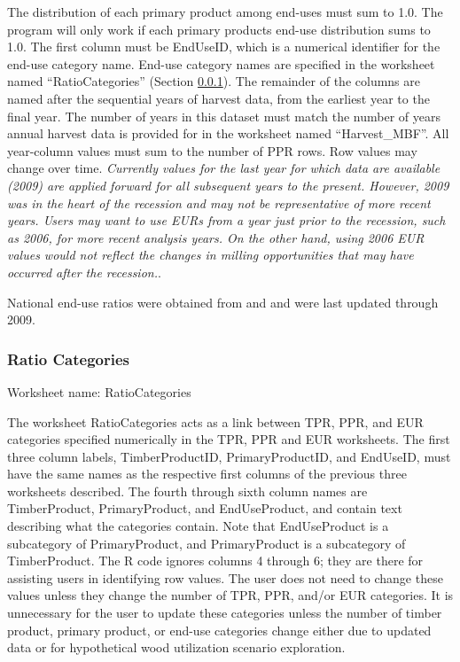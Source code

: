 \documentclass[
  openany]{book}
\begin{document}
The distribution of each primary product among end-uses must sum to 1.0. The program will only work if each primary products end-use distribution sums to 1.0. The first column must be EndUseID, which is a numerical identifier for the end-use category name. End-use category names are specified in the worksheet named ``RatioCategories'' (Section \ref{own-prov-input-rc}). The remainder of the columns are named after the sequential years of harvest data, from the earliest year to the final year. The number of years in this dataset must match the number of years annual harvest data is provided for in the worksheet named ``Harvest\_MBF''. All year-column values must sum to the number of PPR rows. Row values may change over time. \emph{Currently values for the last year for which data are available (2009) are applied forward for all subsequent years to the present. However, 2009 was in the heart of the recession and may not be representative of more recent years. Users may want to use EURs from a year just prior to the recession, such as 2006, for more recent analysis years. On the other hand, using 2006 EUR values would not reflect the changes in milling opportunities that may have occurred after the recession.}.

National end-use ratios were obtained from \textcite{mckeever2009} and \textcite{mckeever2011} and were last updated through 2009.

\hypertarget{own-prov-input-rc}{%
\subsubsection{Ratio Categories}\label{own-prov-input-rc}}

Worksheet name: RatioCategories

The worksheet RatioCategories acts as a link between TPR, PPR, and EUR categories specified numerically in the TPR, PPR and EUR worksheets. The first three column labels, TimberProductID, PrimaryProductID, and EndUseID, must have the same names as the respective first columns of the previous three worksheets described. The fourth through sixth column names are TimberProduct, PrimaryProduct, and EndUseProduct, and contain text describing what the categories contain. Note that EndUseProduct is a subcategory of PrimaryProduct, and PrimaryProduct is a subcategory of TimberProduct. The R code ignores columns 4 through 6; they are there for assisting users in identifying row values. The user does not need to change these values unless they change the number of TPR, PPR, and/or EUR categories. It is unnecessary for the user to update these categories unless the number of timber product, primary product, or end-use categories change either due to updated data or for hypothetical wood utilization scenario exploration.
\end{document}
